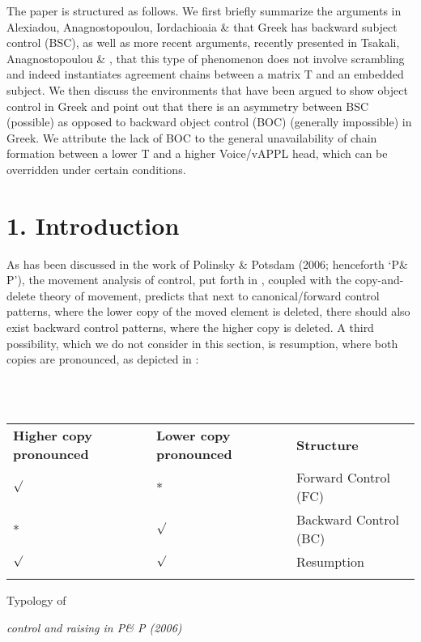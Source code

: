 \documentclass[output=paper]{langsci/langscibook}
\begin{document}
  The paper is structured as follows. We first briefly summarize the arguments in Alexiadou, Anagnostopoulou, Iordachioaia \& \citet{Marchis2010} that Greek has backward subject control (BSC), as well as more recent arguments, recently presented in Tsakali, Anagnostopoulou \& \citet{Alexiadou2017}, that this type of phenomenon does not involve scrambling and indeed instantiates agreement chains between a matrix T and an embedded subject. We then discuss the environments that have been argued to show object control in Greek and point out that there is an asymmetry between BSC (possible) as opposed to backward object control (BOC) (generally impossible) in Greek. We attribute the lack of BOC to the general unavailability of chain formation between a lower T and a higher Voice/vAPPL head, which can be overridden under certain conditions.

\section{ 1. Introduction}

As has been discussed in the work of Polinsky \& Potsdam (2006; henceforth ‘P\& P’), the movement analysis of control, put forth in \citet{Hornstein1999}, coupled with the copy-and-delete theory of movement, predicts that next to canonical/forward control patterns, where the lower copy of the moved element is deleted, there should also exist backward control patterns, where the higher copy is deleted. A third possibility, which we do not consider in this section, is resumption, where both copies are pronounced, as depicted in :

\ea%
    \label{ex:key:1}
    \gll\\
        \\
    \glt
    \z

        

\begin{tabularx}{\textwidth}{XXX}
\lsptoprule
\bfseries Higher copy pronounced & \bfseries Lower copy pronounced & \bfseries Structure\\
${\surd}$ & * & Forward Control (FC)\\
* & ${\surd}$ & Backward Control (BC)\\
${\surd}$ & ${\surd}$ & Resumption\\
\lspbottomrule
\end{tabularx}
\begin{table}
\caption{Typology of} \textit{control and raising in P\& P (2006)}
\label{tab:key:1}
\end{table}
\end{document}
